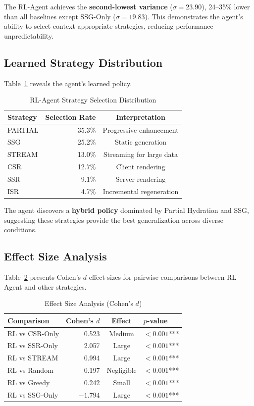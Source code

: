 \documentclass[10pt,twocolumn]{article}
\begin{document}
The RL-Agent achieves the \textbf{second-lowest variance} ($\sigma = 23.90$), 24--35\% lower than all baselines except SSG-Only ($\sigma = 19.83$). This demonstrates the agent's ability to select context-appropriate strategies, reducing performance unpredictability.

\subsection{Learned Strategy Distribution}

Table~\ref{tab:distribution} reveals the agent's learned policy.

\begin{table}[t]
\centering
\caption{RL-Agent Strategy Selection Distribution}
\label{tab:distribution}
\small
\begin{tabular}{lrc}
\toprule
\textbf{Strategy} & \textbf{Selection Rate} & \textbf{Interpretation} \\
\midrule
PARTIAL & 35.3\% & Progressive enhancement \\
SSG & 25.2\% & Static generation \\
STREAM & 13.0\% & Streaming for large data \\
CSR & 12.7\% & Client rendering \\
SSR & 9.1\% & Server rendering \\
ISR & 4.7\% & Incremental regeneration \\
\bottomrule
\end{tabular}
\end{table}

The agent discovers a \textbf{hybrid policy} dominated by Partial Hydration and SSG, suggesting these strategies provide the best generalization across diverse conditions.

\subsection{Effect Size Analysis}

Table~\ref{tab:effects} presents Cohen's $d$ effect sizes for pairwise comparisons between RL-Agent and other strategies.

\begin{table}[t]
\centering
\caption{Effect Size Analysis (Cohen's $d$)}
\label{tab:effects}
\small
\begin{tabular}{lrcl}
\toprule
\textbf{Comparison} & \textbf{Cohen's $d$} & \textbf{Effect} & \textbf{$p$-value} \\
\midrule
RL vs CSR-Only & 0.523 & Medium & $<0.001$*** \\
RL vs SSR-Only & 2.057 & Large & $<0.001$*** \\
RL vs STREAM & 0.994 & Large & $<0.001$*** \\
RL vs Random & 0.197 & Negligible & $<0.001$*** \\
RL vs Greedy & 0.242 & Small & $<0.001$*** \\
RL vs SSG-Only & $-1.794$ & Large & $<0.001$*** \\
\bottomrule
\end{tabular}
\end{table}
\end{document}
